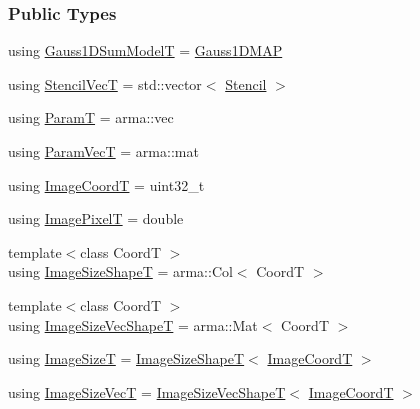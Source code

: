 \subsubsection*{Public Types}
\begin{DoxyCompactItemize}
\item 
using \hyperlink{classmappel_1_1Gauss2DModel_a6e41ec1749814a91648caf394edd4385}{Gauss1\+D\+Sum\+ModelT} = \hyperlink{classmappel_1_1Gauss1DMAP}{Gauss1\+D\+M\+AP}
\item 
using \hyperlink{classmappel_1_1Gauss2DModel_acd9bb0363c841eaa629f68677ed2f214}{Stencil\+VecT} = std\+::vector$<$ \hyperlink{classmappel_1_1Gauss2DModel_1_1Stencil}{Stencil} $>$
\item 
using \hyperlink{classmappel_1_1PointEmitterModel_a665ec6aea3aac139bb69a23c06d4b9a1}{ParamT} = arma\+::vec
\item 
using \hyperlink{classmappel_1_1PointEmitterModel_add253b568d763f1513a810aac35de719}{Param\+VecT} = arma\+::mat
\item 
using \hyperlink{classmappel_1_1ImageFormat2DBase_a45e9234d63c357f34ca56c72c12b9e9c}{Image\+CoordT} = uint32\+\_\+t
\item 
using \hyperlink{classmappel_1_1ImageFormat2DBase_af6bae6f78398ab1eacb39726a05adeef}{Image\+PixelT} = double
\item 
{\footnotesize template$<$class CoordT $>$ }\\using \hyperlink{classmappel_1_1ImageFormat2DBase_a23c1a9e9f1482852aa0cf4951efe7c48}{Image\+Size\+ShapeT} = arma\+::\+Col$<$ CoordT $>$
\item 
{\footnotesize template$<$class CoordT $>$ }\\using \hyperlink{classmappel_1_1ImageFormat2DBase_afe9ededf04942330121003e3dd8f9311}{Image\+Size\+Vec\+ShapeT} = arma\+::\+Mat$<$ CoordT $>$
\item 
using \hyperlink{classmappel_1_1ImageFormat2DBase_a49cccf61eb2a768a202634d27fcd81d5}{Image\+SizeT} = \hyperlink{classmappel_1_1ImageFormat2DBase_a23c1a9e9f1482852aa0cf4951efe7c48}{Image\+Size\+ShapeT}$<$ \hyperlink{classmappel_1_1ImageFormat2DBase_a45e9234d63c357f34ca56c72c12b9e9c}{Image\+CoordT} $>$
\item 
using \hyperlink{classmappel_1_1ImageFormat2DBase_aa88536c52195a927cf32558856f05a13}{Image\+Size\+VecT} = \hyperlink{classmappel_1_1ImageFormat2DBase_afe9ededf04942330121003e3dd8f9311}{Image\+Size\+Vec\+ShapeT}$<$ \hyperlink{classmappel_1_1ImageFormat2DBase_a45e9234d63c357f34ca56c72c12b9e9c}{Image\+CoordT} $>$
\item 

\end{DoxyCompactItemize}
